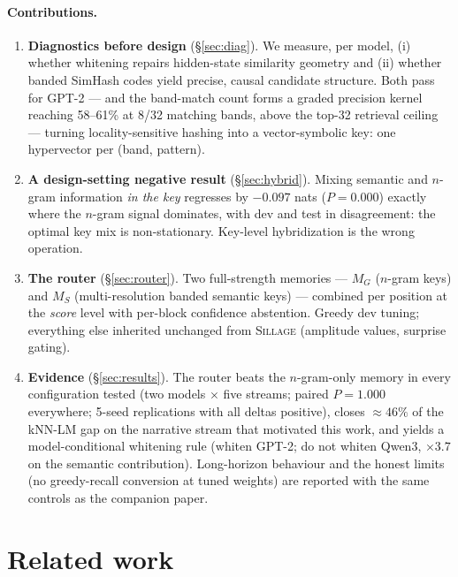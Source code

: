 \documentclass[11pt]{article}
\newcommand{\sillage}{\textsc{Sillage}}
\begin{document}
\paragraph{Contributions.}
\begin{enumerate}[leftmargin=1.5em,itemsep=2pt]
\item \textbf{Diagnostics before design} (\S\ref{sec:diag}). We measure, per model, (i) whether whitening repairs hidden-state similarity geometry and (ii) whether banded SimHash codes yield precise, causal candidate structure. Both pass for GPT-2 --- and the band-match count forms a graded precision kernel reaching 58--61\% at 8/32 matching bands, above the top-32 retrieval ceiling --- turning locality-sensitive hashing \cite{indyk,charikar} into a vector-symbolic key: one hypervector per (band, pattern).
\item \textbf{A design-setting negative result} (\S\ref{sec:hybrid}). Mixing semantic and $n$-gram information \emph{in the key} regresses by $-0.097$ nats ($P{=}0.000$) exactly where the $n$-gram signal dominates, with dev and test in disagreement: the optimal key mix is non-stationary. Key-level hybridization is the wrong operation.
\item \textbf{The router} (\S\ref{sec:router}). Two full-strength memories --- $M_G$ ($n$-gram keys) and $M_S$ (multi-resolution banded semantic keys) --- combined per position at the \emph{score} level with per-block confidence abstention. Greedy dev tuning; everything else inherited unchanged from \sillage{} (amplitude values, surprise gating).
\item \textbf{Evidence} (\S\ref{sec:results}). The router beats the $n$-gram-only memory in every configuration tested (two models $\times$ five streams; paired $P = 1.000$ everywhere; 5-seed replications with all deltas positive), closes $\approx 46\%$ of the kNN-LM gap on the narrative stream that motivated this work, and yields a model-conditional whitening rule (whiten GPT-2; do not whiten Qwen3, $\times 3.7$ on the semantic contribution). Long-horizon behaviour and the honest limits (no greedy-recall conversion at tuned weights) are reported with the same controls as the companion paper.
\end{enumerate}

\section{Related work}
\end{document}
